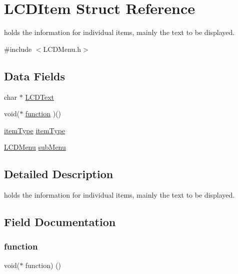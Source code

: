 \hypertarget{struct_l_c_d_item}{}\section{L\+C\+D\+Item Struct Reference}
\label{struct_l_c_d_item}


holds the information for individual items, mainly the text to be displayed.  




{\ttfamily \#include $<$L\+C\+D\+Menu.\+h$>$}

\subsection*{Data Fields}
\begin{DoxyCompactItemize}
\item 
char $\ast$ \hyperlink{struct_l_c_d_item_a3265d5a814cae9c1ce47d7e878c45c64}{L\+C\+D\+Text}
\item 
void($\ast$ \hyperlink{struct_l_c_d_item_a92c749b399f1281b6a38296730befc65}{function} )()
\item 
\hyperlink{_l_c_d_menu_8h_a090b740ab4ce239469ae5916e79846fa}{item\+Type} \hyperlink{struct_l_c_d_item_ad628598d6019c8248dd0b161654253c8}{item\+Type}
\item 
\hyperlink{struct_l_c_d_menu}{L\+C\+D\+Menu} \hyperlink{struct_l_c_d_item_af3cbf3c417e8237330132b5ab5448b16}{sub\+Menu}
\end{DoxyCompactItemize}


\subsection{Detailed Description}
holds the information for individual items, mainly the text to be displayed. 

\subsection{Field Documentation}
\hypertarget{struct_l_c_d_item_a92c749b399f1281b6a38296730befc65}{}\label{struct_l_c_d_item_a92c749b399f1281b6a38296730befc65} 
\subsubsection{\texorpdfstring{function}{function}}
{\footnotesize\ttfamily void($\ast$ function) ()}

